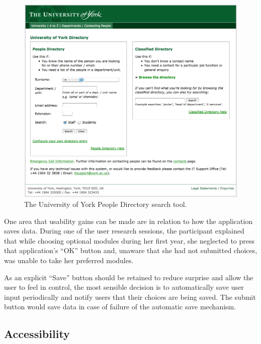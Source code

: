 \documentclass[draft]{scrartcl}
\begin{document}
\begin{figure}
  \begin{center}
    \includegraphics[width=160mm]{images/2011_11_06_yorkacuk_directory.png}
  \end{center}
  \caption{The University of York People Directory search tool.}
  \label{yorkacuk_directory_search}
\end{figure}


One area that usability gains can be made are in relation to how the
application saves data. During one of the user research sessions, the
participant explained that while choosing optional modules during her first
year, she neglected to press that application's ``OK'' button and, unaware
that she had not submitted choices, was unable to take her preferred modules.

As an explicit ``Save'' button should be retained to reduce surprise and allow
the user to feel in control, the most sensible decision is to automatically
save user input periodically and notify users that their choices are being
saved. The submit button would save data in case of failure of the automatic
save mechanism.

\subsection{Accessibility}
\end{document}

